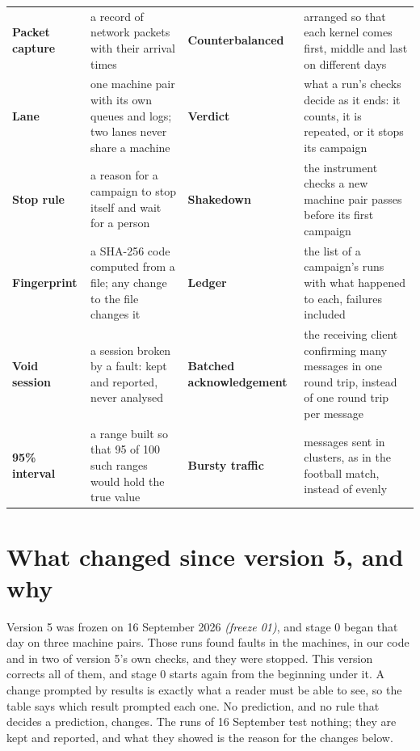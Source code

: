 \documentclass[11pt]{article}
\newcommand{\gl}[1]{{\color{soft}\itshape\small (#1)}}
\begin{document}
{\begin{tabularx}{\linewidth}{@{}>{\bfseries}p{3.1cm} X >{\bfseries}p{3.1cm} X@{}}
Packet capture & a record of network packets with their arrival times & Counterbalanced & arranged so that each kernel comes first, middle and last on different days \\
Lane & one machine pair with its own queues and logs; two lanes never share a machine & Verdict & what a run's checks decide as it ends: it counts, it is repeated, or it stops its campaign \\
Stop rule & a reason for a campaign to stop itself and wait for a person & Shakedown & the instrument checks a new machine pair passes before its first campaign \\
Fingerprint & a SHA-256 code computed from a file; any change to the file changes it & Ledger & the list of a campaign's runs with what happened to each, failures included \\
Void session & a session broken by a fault: kept and reported, never analysed & Batched acknowledgement & the receiving client confirming many messages in one round trip, instead of one round trip per message \\
95\% interval & a range built so that 95 of 100 such ranges would hold the true value & Bursty traffic & messages sent in clusters, as in the football match, instead of evenly \\
\end{tabularx}}

\section*{What changed since version 5, and why}
Version 5 was frozen on 16 September 2026 \gl{freeze 01}, and stage 0 began that day on three machine pairs. Those runs found faults in the machines, in our code and in two of version 5's own checks, and they were stopped. This version corrects all of them, and stage 0 starts again from the beginning under it. A change prompted by results is exactly what a reader must be able to see, so the table says which result prompted each one. No prediction, and no rule that decides a prediction, changes. The runs of 16 September test nothing; they are kept and reported, and what they showed is the reason for the changes below.
\end{document}
